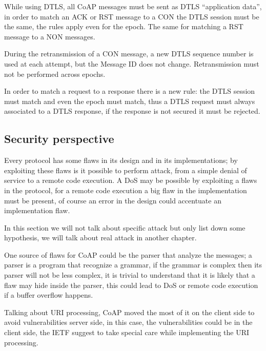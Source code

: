 	While using DTLS, all CoAP messages must be sent as DTLS “application data”, in order to match an ACK or RST message to a CON the DTLS session must be the same, the rules apply even for the epoch.\newline
	The same for matching a RST message to a NON messages.\newline
	
	During the retransmission of a CON message, a new DTLS sequence number is used at each attempt, but the Message ID does not change.\newline
	Retransmission must not be performed across epochs.\newline
	
	In order to match a request to a response there is a new rule: the DTLS session must match and even the epoch must match, thus a DTLS request must always associated to a DTLS response, if the response is not secured it must be rejected.
	
	\subsection{Security perspective}
	Every protocol has some flaws in its design and in its implementations; by exploiting these flaws is it possible to perform attack, from a simple denial of service to a remote code execution.\newline
	A DoS may be possible by exploiting a flaws in the protocol, for a remote code execution a big flaw in the implementation must be present, of course an error in the design could accentuate an implementation flaw.\newline
	
	In this section we will not talk about specific attack but only list down some hypothesis, we will talk about real attack in another chapter.\newline
	
	One source of flaws for CoAP could be the parser that analyze the messages; a parser is a program that recognize a grammar, if the grammar is complex then its parser will not be less complex, it is trivial to understand that it is likely that a flaw may hide inside the parser, this could lead to DoS or remote code execution if a buffer overflow happens.\newline
	
	Talking about URI processing, CoAP moved the most of it on the client side to avoid vulnerabilities server side, in this case, the vulnerabilities could be in the client side, the IETF suggest to take special care while implementing the URI processing.\newline
	
